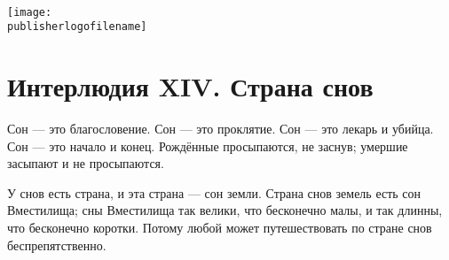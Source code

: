 % 


\begin{titlepage}
{
\centering
{~\par}
\vspace{0.25\textheight}
{\LARGE\bookauthor\par}
\vspace{1.3cm}
{\Huge\textbf{\booktitle}\par}
\vfill
{\texttt{[image: \\publisherlogofilename]}\par}
}
\end{titlepage}


\tableofcontents

\pagestyle{fancy}


\chapter*{Интерлюдия XIV. Страна снов}

Сон --- это благословение.
Сон --- это проклятие.
Сон --- это лекарь и убийца.
Сон --- это начало и конец.
Рождённые просыпаются, не заснув;
умершие засыпают и не просыпаются.

У снов есть страна, и эта страна --- сон земли.
Страна снов земель есть сон Вместилища;
сны Вместилища так велики, что бесконечно малы, и так длинны, что бесконечно коротки.
Потому любой может путешествовать по стране снов беспрепятственно.

